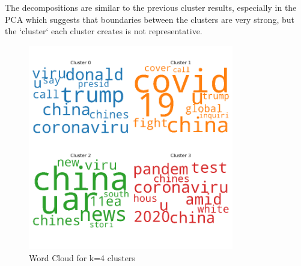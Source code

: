 The decompositions are similar to the previous cluster results, especially in the PCA which suggests that boundaries between the clusters are very strong, but the `cluster` each cluster creates is not representative.
\begin{figure}[H]
	\centering
	\includegraphics[width=0.8\textwidth]{images/kmeans_word_cloud_k=4.png}
	\caption{Word Cloud for k=4 clusters}
	\label{fig:wck4}
\end{figure}


